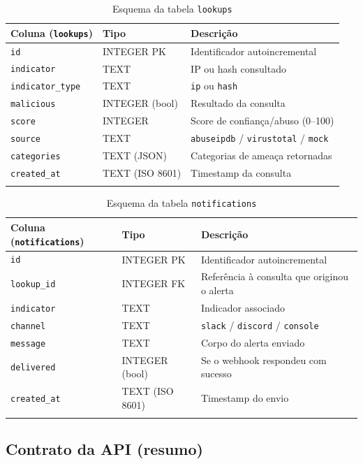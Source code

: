 \documentclass[11pt,a4paper]{article}
\begin{document}
\begin{longtable}{p{2.6cm}p{2.2cm}p{7.7cm}}
\toprule
\textbf{Coluna (\texttt{lookups})} & \textbf{Tipo} & \textbf{Descrição} \\
\midrule
\endhead
\texttt{id} & INTEGER PK & Identificador autoincremental \\
\texttt{indicator} & TEXT & IP ou hash consultado \\
\texttt{indicator\_type} & TEXT & \texttt{ip} ou \texttt{hash} \\
\texttt{malicious} & INTEGER (bool) & Resultado da consulta \\
\texttt{score} & INTEGER & Score de confiança/abuso (0--100) \\
\texttt{source} & TEXT & \texttt{abuseipdb} / \texttt{virustotal} / \texttt{mock} \\
\texttt{categories} & TEXT (JSON) & Categorias de ameaça retornadas \\
\texttt{created\_at} & TEXT (ISO 8601) & Timestamp da consulta \\
\bottomrule
\caption{Esquema da tabela \texttt{lookups}}
\end{longtable}

\begin{longtable}{p{2.6cm}p{2.2cm}p{7.7cm}}
\toprule
\textbf{Coluna (\texttt{notifications})} & \textbf{Tipo} & \textbf{Descrição} \\
\midrule
\endhead
\texttt{id} & INTEGER PK & Identificador autoincremental \\
\texttt{lookup\_id} & INTEGER FK & Referência à consulta que originou o alerta \\
\texttt{indicator} & TEXT & Indicador associado \\
\texttt{channel} & TEXT & \texttt{slack} / \texttt{discord} / \texttt{console} \\
\texttt{message} & TEXT & Corpo do alerta enviado \\
\texttt{delivered} & INTEGER (bool) & Se o webhook respondeu com sucesso \\
\texttt{created\_at} & TEXT (ISO 8601) & Timestamp do envio \\
\bottomrule
\caption{Esquema da tabela \texttt{notifications}}
\end{longtable}

\subsection{Contrato da API (resumo)}
\end{document}
